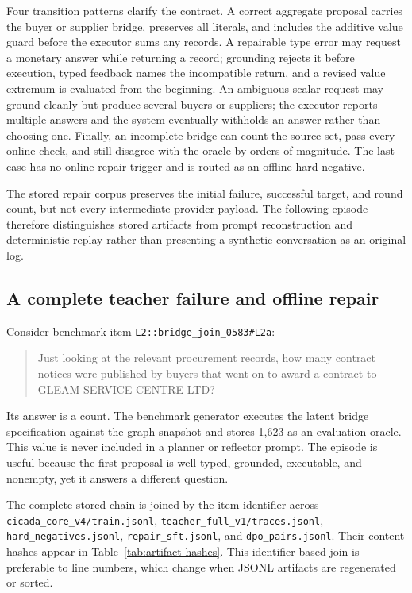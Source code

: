 \documentclass{article}
\begin{document}
Four transition patterns clarify the contract.  A correct aggregate proposal carries the buyer or
supplier bridge, preserves all literals, and includes the additive value guard before the executor
sums any records.  A repairable type error may request a monetary answer while returning a record;
grounding rejects it before execution, typed feedback names the incompatible return, and a revised
value extremum is evaluated from the beginning.  An ambiguous scalar request may ground cleanly but
produce several buyers or suppliers; the executor reports multiple answers and the system eventually
withholds an answer rather than choosing one.  Finally, an incomplete bridge can count the source
set, pass every online check, and still disagree with the oracle by orders of magnitude.  The last
case has no online repair trigger and is routed as an offline hard negative.

The stored repair corpus preserves the initial failure, successful target, and round count, but not
every intermediate provider payload.  The following episode therefore distinguishes stored
artifacts from prompt reconstruction and deterministic replay rather than presenting a synthetic
conversation as an original log.

\subsection{A complete teacher failure and offline repair}
\label{app:complete-repair}

Consider benchmark item \texttt{L2::bridge\_join\_0583\#L2a}:
\begin{quote}\small
Just looking at the relevant procurement records, how many contract notices were published by
buyers that went on to award a contract to GLEAM SERVICE CENTRE LTD?
\end{quote}
Its answer is a count.  The benchmark generator executes the latent bridge specification against
the graph snapshot and stores 1,623 as an evaluation oracle.  This value is never included in a
planner or reflector prompt.  The episode is useful because the first proposal is well typed,
grounded, executable, and nonempty, yet it answers a different question.

The complete stored chain is joined by the item identifier across
\texttt{cicada\_core\_v4/train.jsonl}, \texttt{teacher\_full\_v1/traces.jsonl},
\texttt{hard\_negatives.jsonl}, \texttt{repair\_sft.jsonl}, and \texttt{dpo\_pairs.jsonl}.  Their
content hashes appear in Table~\ref{tab:artifact-hashes}.  This identifier based join is preferable
to line numbers, which change when JSONL artifacts are regenerated or sorted.
\end{document}
